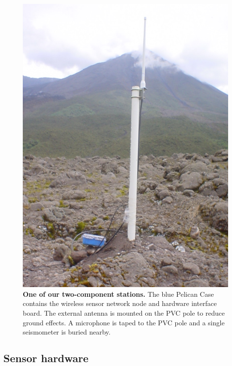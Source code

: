\begin{figure}[t]
\begin{center}
\includegraphics[width=0.7\hsize]{./4-architecture/figs/Node-212-5}
\end{center}
\caption{\textbf{One of our two-component stations.} The blue Pelican
Case contains the wireless sensor network node and hardware interface board.
The external antenna is mounted on the PVC pole to reduce ground effects.
A microphone is taped to the PVC pole and a single seismometer is buried
nearby.}
\label{includegraphics-fig-station2}
\end{figure}


\subsection{Sensor hardware}
\label{evaluation-sec-hardware}


